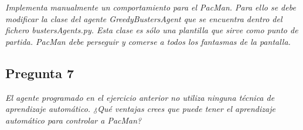 \documentclass[12pt]{article}
\begin{document}
\emph{Implementa manualmente un comportamiento para el PacMan. Para ello se
debe modificar la clase del agente GreedyBustersAgent que se encuentra dentro
del fichero bustersAgents.py. Esta clase es sólo una plantilla que sirve como
punto de partida. PacMan debe perseguir y comerse a todos los fantasmas de la
pantalla.}\\

\subsection{Pregunta 7}

\emph{El agente programado en el ejercicio anterior no utiliza ninguna técnica
de aprendizaje automático. ¿Qué ventajas crees que puede tener el aprendizaje
automático para controlar a PacMan?}\\
\end{document}
